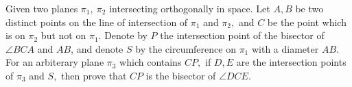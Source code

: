 Given two planes $\pi _1,\ \pi _2$ intersecting orthogonally in space. Let $A,B$ be two distinct points on the line of intersection of $\pi _1$ and $\pi _2,$ and $C$ be the point which is on  $\pi _2$ but not on $\pi_1.$ Denote by $P$ the intersection point of the bisector of $\angle {BCA}$ and $AB$, and denote $S$ by the circumference on $\pi _1$ with a diameter $AB.$ For an arbiterary plane $\pi _3$ which contains $CP,$ if $D,E$ are the intersection points of $\pi_3$ and $S,$ then prove that $CP$ is the bisector of $\angle {DCE}.$